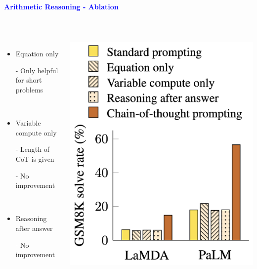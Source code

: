 \documentclass[professionalfont]{beamer}
\begin{document}
\begin{frame}
\begin{center}
    { \textbf{\textcolor{blue}{ {\fontsize{12}{14}\selectfont Arithmetic Reasoning - Ablation} }} }
\end{center}
\\[0.3cm]

\begin{columns}
    {\fontsize{10}{14}\selectfont 
    \begin{itemize}
        \item Equation only

        - Only helpful for short problems

        \\[0.3cm]

        \item Variable compute only

        - Length of CoT is given

        - No improvement

        \\[0.3cm]

        \item Reasoning after answer

        - No improvement
    \end{itemize}
    }
    \includegraphics[width=0.9\linewidth]{figure5.png}
\end{columns}

\end{frame}
\end{document}
